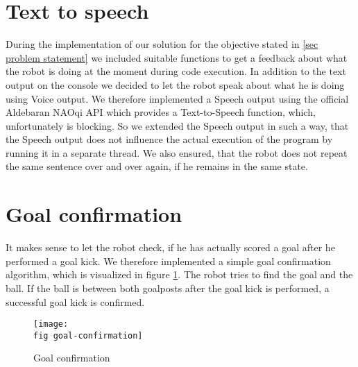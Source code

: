 \section{Text to speech}

During the implementation of our solution for the objective stated in \ref{sec
  problem statement} we included suitable functions to get a feedback about
what the robot is doing at the moment during code execution. In addition to the
text output on the console we decided to let the robot speak about what he is
doing using Voice output. We therefore implemented a Speech output using the
official Aldebaran NAOqi API \cite{naoqi-sdk} which provides a Text-to-Speech
function, which, unfortunately is blocking. So we extended the Speech output in
such a way, that the Speech output does not influence the actual execution of
the program by running it in a separate thread. We also ensured, that the robot
does not repeat the same sentence over and over again, if he remains in the
same state.

\section{Goal confirmation}

It makes sense to let the robot check, if he has actually scored a goal after
he performed a goal kick. We therefore implemented a simple goal confirmation
algorithm, which is visualized in figure \ref{j figure goal confirmation}. The
robot tries to find the goal and the ball. If the ball is between both
goalposts after the goal kick is performed, a successful goal kick is
confirmed.

\begin{figure}[ht]
  \texttt{[image: \\fig goal-confirmation]}
  \caption{Goal confirmation}
  \label{j figure goal confirmation}
\end{figure}
